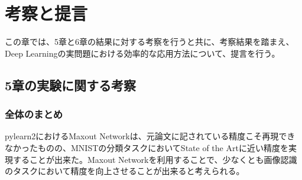 \chapter{考察と提言}
この章では、5章と6章の結果に対する考察を行うと共に、考察結果を踏まえ、Deep Learningの実問題における効率的な応用方法について、提言を行う。
\section{5章の実験に関する考察}
\subsection{全体のまとめ}
pylearn2におけるMaxout Networkは、元論文に記されている精度こそ再現できなかったものの、MNISTの分類タスクにおいてState of the Artに近い精度を実現することが出来た。Maxout Networkを利用することで、少なくとも画像認識のタスクにおいて精度を向上させることが出来ると考えられる。\par
